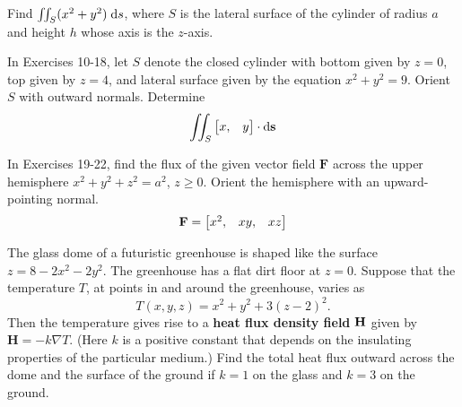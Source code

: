 \documentclass[boxes]{gsypset}
\newcommand{\dv}[1]{\cdot \mathrm{d}\mathbf{#1}}
\begin{document}

\begin{problem}[7.2.6]
	Find $\iint_S(x^2 + y^2) \;\mathrm{d}s$, where 
	$S$ is the lateral surface of the cylinder of radius $a$ and height $h$ 
	whose axis is the $z$-axis.
\end{problem}
\begin{solution}
	
\end{solution}

\begin{problem}[7.2.14]
	In Exercises 10-18, let $S$ denote the closed cylinder with 
	bottom given by $z=0$, top given by $z=4$, and lateral surface given by the equation $x^2+y^2=9$. 
	Orient $S$ with outward normals. 
	Determine
	\[
		\iint_S \bm{x, & y} \dv{s}
	\]
\end{problem}
\begin{solution}
	
\end{solution}

\begin{problem}[7.2.22]
	In Exercises 19-22, find the flux of the given vector field $\mathbf{F}$ 
	across the upper hemisphere $x^2 + y^2 + z^2 = a^2$, $z \geq 0$. 
	Orient the hemisphere with an upward-pointing normal.
	\[
		\mathbf{F} = \begin{bmatrix}x^2, & xy, & xz\end{bmatrix}
	\]
\end{problem}
\begin{solution}
	
\end{solution}

\begin{problem}[7.2.28]
	The glass dome of a futuristic greenhouse is shaped like the surface $z=8-2x^2-2y^2$. 
	The greenhouse has a flat dirt floor at $z=0$. 
	Suppose that the temperature $T$, at points in and around the greenhouse, varies as
	\[
		T(x,y,z) = x^2 + y^2 + 3(z-2)^2.
	\]
	Then the temperature gives rise to a \textbf{heat flux density field} $\bf{H}$ given by 
	$\mathbf{H} = -k\nabla T$. 
	(Here $k$ is a positive constant that depends on the 
	insulating properties of the particular medium.) 
	Find the total heat flux outward across the dome and the surface of the ground 
	if $k=1$ on the glass and $k=3$ on the ground.
\end{problem}
\begin{solution}
	
\end{solution}
\end{document}
